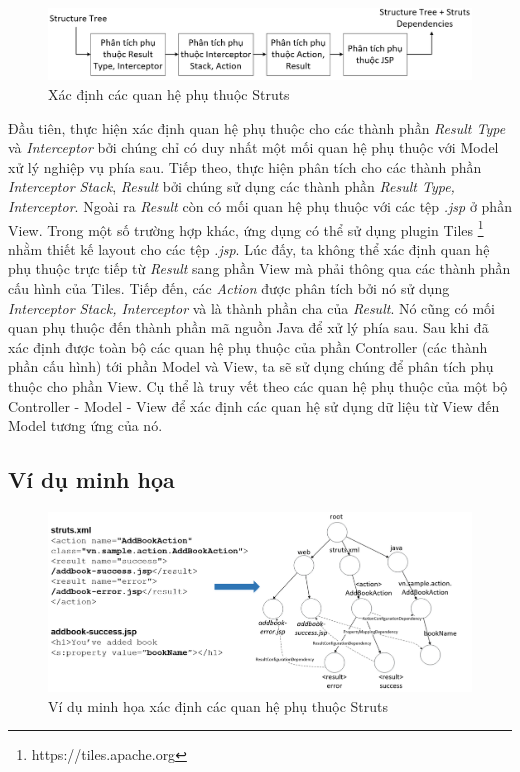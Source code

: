 \documentclass[12pt]{report}
\begin{document}
\begin{figure}[h]
	\centering
	\includegraphics[scale=0.55]{struts-analyzer}
	\caption{Xác định các quan hệ phụ thuộc Struts}
	\label{fig:struts-analyzer}
\end{figure}

Đầu tiên, thực hiện xác định quan hệ phụ thuộc cho các thành phần \textit{Result Type} và \textit{Interceptor} bởi chúng chỉ có duy nhất một mối quan hệ phụ thuộc với Model xử lý nghiệp vụ phía sau. Tiếp theo, thực hiện phân tích cho các thành phần \textit{Interceptor Stack}, \textit{Result} bởi chúng sử dụng các thành phần \textit{Result Type, Interceptor}. Ngoài ra \textit{Result} còn có mối quan hệ phụ thuộc với các tệp \textit{.jsp} ở phần View. Trong một số trường hợp khác, ứng dụng có thể sử dụng plugin Tiles \footnote{https://tiles.apache.org} nhằm thiết kế layout cho các tệp \textit{.jsp}. Lúc đấy, ta không thể xác định quan hệ phụ thuộc trực tiếp từ \textit{Result} sang phần View mà phải thông qua các thành phần cấu hình của Tiles. Tiếp đến, các \textit{Action} được phân tích bởi nó sử dụng \textit{Interceptor Stack, Interceptor} và là thành phần cha của \textit{Result}. Nó cũng có mối quan phụ thuộc đến thành phần mã nguồn Java để xử lý phía sau. Sau khi đã xác định được toàn bộ các quan hệ phụ thuộc của phần Controller (các thành phần cấu hình) tới phần Model và View, ta sẽ sử dụng chúng để phân tích phụ thuộc cho phần View. Cụ thể là truy vết theo các quan hệ phụ thuộc của một bộ Controller - Model - View để xác định các quan hệ sử dụng dữ liệu từ View đến Model tương ứng của nó.

\subsection{Ví dụ minh họa}

\begin{figure}[h]
	\centering
	\includegraphics[scale=0.53]{struts-analyzer-sample}
	\caption{Ví dụ minh họa xác định các quan hệ phụ thuộc Struts}
	\label{fig:struts-analyzer-sample}
\end{figure}
\end{document}
